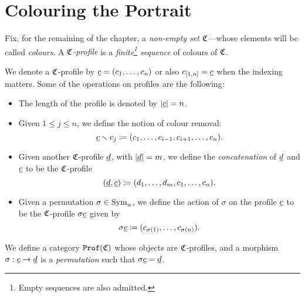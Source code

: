 \section{Colouring the Portrait}

\begin{definition}
    \label{def:colors-profiles}
    Fix, for the remaining of the chapter, a \emph{non-empty set} \(\mathfrak{C}\)---whose
    elements will be called \emph{colours}. A \emph{\(\mathfrak{C}\)-profile} is a
    \emph{finite\footnote{Empty sequences are also admitted.} sequence} of colours of
    \(\mathfrak{C}\).
\end{definition}

\begin{notation}
    \label{not:profiles-and-operations}
    We denote a \(\mathfrak{C}\)-profile by \(\underline{c} = (c_1, \dots, c_n)\) or also
    \(c_{[1, n]} = \underline{c}\) when the indexing matters. Some of the operations on
    profiles are the following:
    \begin{itemize}\setlength\itemsep{0em}
        \item The length of the profile is denoted by \(|\underline{c}| = n\).
        \item Given \(1 \leq j \leq n\), we define the notion of colour removal:
              \[
                  \underline{c} \smallsetminus c_j \coloneq (c_1, \dots, c_{i-1}, c_{i+1}, \dots, c_n).
              \]
        \item Given another \(\mathfrak{C}\)-profile \(\underline{d}\), with \(|\underline{d}| = m\), we
              define the \emph{concatenation} of \(\underline{d}\) and \(\underline{c}\) to be the
              \(\mathfrak{C}\)-profile
              \[
                  (\underline{d}, \underline{c}) \coloneq (d_1, \dots, d_m, c_1, \dots, c_n).
              \]
        \item Given a permutation \(\sigma \in \operatorname{Sym}_n\), we define the action of
              \(\sigma\) on the profile \(\underline{c}\) to be the \(\mathfrak{C}\)-profile \(\sigma
              \underline{c}\) given by
              \[
                  \sigma \underline{c} \coloneq (c_{\sigma(1)}, \dots, c_{\sigma(n)}).
              \]
    \end{itemize}
\end{notation}

\begin{definition}
    \label{def:profile-category}
    We define a category \({\texttt{Prof}(\mathfrak{C})}\) whose objects are \(\mathfrak{C}\)-profiles, and a
    morphism \(\sigma: \underline{c} \to \underline{d}\) is a \emph{permutation} such that
    \(\sigma \underline{c} = \underline{d}\).
\end{definition}

